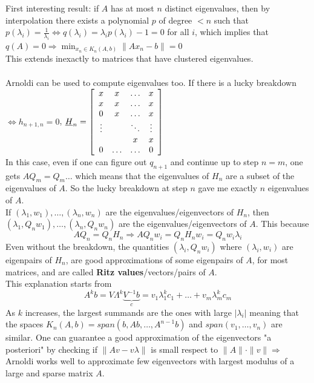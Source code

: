 \documentclass[10pt]{report}
\begin{document}
First interesting result: if $A$ has at most $n$ distinct eigenvalues, then by interpolation there exists a polynomial $p$ of degree $< n$ such that $p(\lambda_i)=\frac{1}{\lambda_i}\Leftrightarrow q(\lambda_i)=\lambda_ip(\lambda_i)-1 = 0$ for all $i$, which implies that $q(A) = 0\Rightarrow \min_{x_n\in K_n(A,b)} \|Ax_n - b\| = 0$\\
This extends inexactly to matrices that have clustered eigenvalues.\\\\
Arnoldi can be used to compute eigenvalues too. If there is a lucky breakdown $\Leftrightarrow h_{n+1,n}=0$, $\underline{H}_n=\left[\begin{array}{c c c c}
x & x & \ldots & x\\
x & x & \ldots & x\\
0 & x & \ldots & x\\
\vdots & & \ddots & \vdots\\
& & x & x\\
0 & \ldots & \ldots & 0
\end{array}\right]$\\
In this case, even if one can figure out $q_{n+1}$ and continue up to step $n=m$, one gets $AQ_m = Q_m\ldots$ which means that the eigenvalues of $H_n$ are a subset of the eigenvalues of $A$. So the lucky breakdown at step $n$ gave me exactly $n$ eigenvalues of $A$.\\
If $(\lambda_1,w_1),\ldots,(\lambda_n,w_n)$ are the eigenvalues/eigenvectors of $H_n$, then $(\lambda_1,Q_nw_1),\ldots,(\lambda_n,Q_nw_n)$ are the eigenvalues/eigenvectors of $A$. This because $$AQ_n = Q_nH_n \Rightarrow AQ_nw_i = Q_nH_nw_i = Q_nw_i\lambda_i$$
Even without the breakdown, the quantities $(\lambda_i, Q_nw_i)$ where $(\lambda_i, w_i)$ are eigenpairs of $H_n$, are good approximations of some eigenpairs of $A$, for most matrices, and are called \textbf{Ritz values}/vectors/pairs of $A$.\\
This explanation starts from $$A^kb = V \Lambda^k \underset{c}{\underbrace{V^{-1} b}} = v_1\lambda_1^kc_1+\ldots+v_m\lambda_m^kc_m$$
As $k$ increases, the largest summands are the ones with large $|\lambda_i|$ meaning that the spaces $K_n(A,b)=span(b,Ab,\ldots,A^{n-1}b)$ and $span(v_1,\ldots,v_n)$ are similar. One can guarantee a good approximation of the eigenvectors "a posteriori" by checking if $\|Av-v\lambda\|$ is small respect to $\|A\|\cdot\|v\|\Rightarrow$ Arnoldi works well to approximate few eigenvectors with largest modulus of a large and sparse matrix $A$.\\\\
\end{document}

